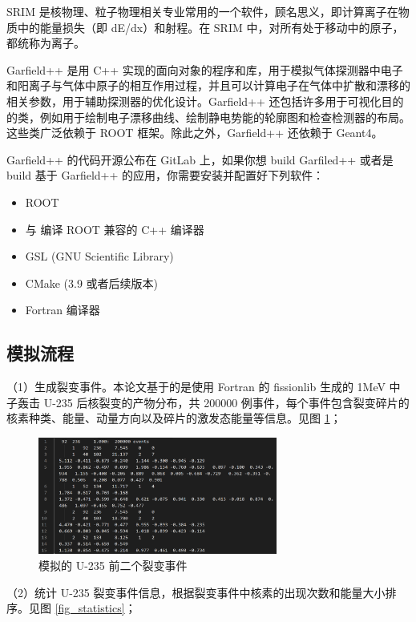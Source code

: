 \documentclass[AutoFakeBold]{LZUThesis}
\begin{document}
SRIM 是核物理、粒子物理相关专业常用的一个软件，顾名思义，即计算离子在物质中的能量损失（即 dE/dx）和射程。在 SRIM 中，对所有处于移动中的原子，都统称为离子。

Garfield++ 是用 C++ 实现的面向对象的程序和库，用于模拟气体探测器中电子和阳离子与气体中原子的相互作用过程，并且可以计算电子在气体中扩散和漂移的相关参数，用于辅助探测器的优化设计。Garfield++ 还包括许多用于可视化目的的类，例如用于绘制电子漂移曲线、绘制静电势能的轮廓图和检查检测器的布局。这些类广泛依赖于 ROOT 框架。除此之外，Garfield++ 还依赖于 Geant4。

Garfield++ 的代码开源公布在 GitLab 上，如果你想 build Garfiled++ 或者是 build 基于 Garfield++ 的应用，你需要安装并配置好下列软件\cite{schindler2019garfield}：

\begin{itemize}
    \item ROOT
    \item 与 编译 ROOT 兼容的 C++ 编译器
    \item GSL (GNU Scientific Library)
    \item CMake (3.9 或者后续版本)
    \item Fortran 编译器
\end{itemize}




\subsection{模拟流程}
（1）生成裂变事件。本论文基于的是使用 Fortran 的 fissionlib 生成的 1MeV 中子轰击 U-235 后核裂变的产物分布，共 200000 例事件，每个事件包含裂变碎片的核素种类、能量、动量方向以及碎片的激发态能量等信息。见图 \ref{fig_U_235_events}；

\begin{figure}[H]
    \centering
    \includegraphics[width=0.7\textwidth]{figures/U-235-events.png}
    \caption{模拟的 U-235 前二个裂变事件}
    \label{fig_U_235_events}
\end{figure}

（2）统计 U-235 裂变事件信息，根据裂变事件中核素的出现次数和能量大小排序。见图 \ref{fig_statistics}；
\end{document}
